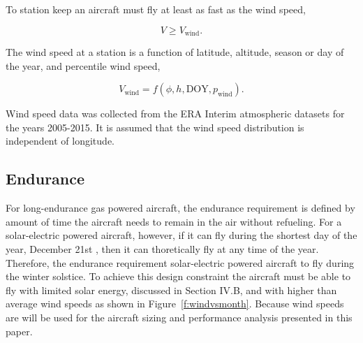 \DIFaddend To station keep an aircraft must fly at least as fast as the wind speed,

\begin{equation}
    \label{e:availreq}
    V \geq V_{\text{wind}}.
\end{equation}

The wind speed at a station is a function of latitude, altitude, season or day of the year, and percentile wind speed,

\begin{equation}
    \label{e:windspeed}
    V_{\text{wind}} = f(\phi, h, \text{DOY}, p_{\text{wind}}).
    \end{equation}

Wind speed data was collected from the ERA Interim atmospheric datasets for the years 2005-2015.\cite{wind} 
It is assumed that the wind speed distribution is independent of longitude. 

\subsection{Endurance}

For long-endurance gas powered aircraft, the endurance requirement is defined by amount of time the aircraft needs to remain in the air without refueling.  
For a solar-electric powered aircraft, however, if it can fly during the shortest day of the year, December 21st \DIFaddbegin {}\DIFaddend , then it can thoretically fly at any time of the year\DIFaddbegin {}\DIFaddend . 
Therefore, \DIFaddbegin {}\DIFaddend the endurance requirement \DIFdelbegin {}\DIFdelend \DIFaddbegin {}\DIFaddend solar-electric powered aircraft \DIFdelbegin {}\DIFdelend \DIFaddbegin {}\DIFaddend to fly during the winter solstice.  
To achieve this design constraint the aircraft must be able to fly with limited solar energy, discussed in Section IV.B, and with higher than average wind speeds as shown in Figure~\ref{f:windvsmonth}.  
Because \DIFdelbegin {}\DIFdelend \DIFaddbegin {}\DIFaddend wind speeds are \DIFdelbegin {}\DIFdelend \DIFaddbegin {}\DIFaddend will be used for the aircraft sizing and performance analysis presented in this paper. 


